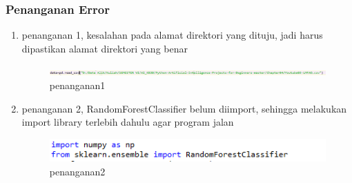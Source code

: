 \subsubsection{Penanganan Error}
\begin{enumerate}
\item penanganan 1, kesalahan pada alamat direktori yang dituju, jadi harus dipastikan alamat direktori yang benar
\begin{figure}[H]
\centering
\includegraphics[scale=1]{figures/1174057/chapter4/penanganan1.PNG}
\caption{penanganan1}
\label{penanganan1}
\end{figure}    

\item penanganan 2, RandomForestClassifier belum diimport, sehingga melakukan import library terlebih dahulu agar program jalan
\begin{figure}[H]
\centering
\includegraphics[scale=1]{figures/1174057/chapter4/penanganan2.PNG}
\caption{penanganan2}
\label{penanganan2}
\end{figure}    
\end{enumerate}





